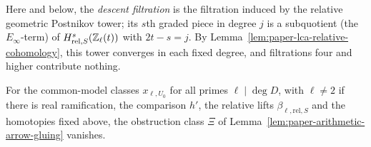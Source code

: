 Here and below, the \emph{descent filtration} is the filtration induced by the relative geometric Postnikov tower; its $s$th graded piece in degree $j$ is a subquotient (the $E_\infty$-term) of $H^s_{\mathrm{rel},S}(\mathbb Z_\ell(t))$ with $2t-s=j$.
By Lemma~\ref{lem:paper-lca-relative-cohomology}, this tower converges in each fixed degree, and filtrations four and higher contribute nothing.

\begin{lemma}\label{lem:paper-lca-obstruction-vanishing}
For the common-model classes $x_{\ell,U_0}$ for all primes $\ell\mid\deg D$, with $\ell\ne2$ if there is real ramification, the comparison $h'$, the relative lifts $\beta_{\ell,\mathrm{rel},S}$ and the homotopies fixed above, the obstruction class $\Xi$ of Lemma~\ref{lem:paper-arithmetic-arrow-gluing} vanishes.
\end{lemma}
